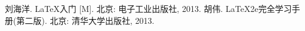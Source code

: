 \documentclass{cjc}
\begin{document}










\begin{thebibliography}{1}
   刘海洋. \LaTeX 入门 [M]. 北京: 电子工业出版社, 2013.
    胡伟. \LaTeX 2e完全学习手册(第二版). 北京: 清华大学出版社, 2013.
  \end{thebibliography}
\end{document}
